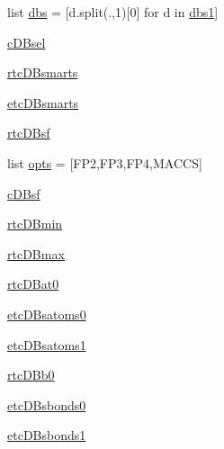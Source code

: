 \begin{DoxyCompactItemize}
list \hyperlink{classmolSimplify_1_1Classes_1_1mGUI_1_1mGUI_a1a51df5812fa8895e74f13104e0fd043}{dbs} = \mbox{[}d.\+split(\textquotesingle{}.\textquotesingle{},1)\mbox{[}0\mbox{]} for d in \hyperlink{classmolSimplify_1_1Classes_1_1mGUI_1_1mGUI_a83690ec49c577263f54a274b8e01853c}{dbs1}\mbox{]}
\item 
\hyperlink{classmolSimplify_1_1Classes_1_1mGUI_1_1mGUI_a847a0f6d747033d64d3c2d88321b89c9}{c\+D\+Bsel}
\item 
\hyperlink{classmolSimplify_1_1Classes_1_1mGUI_1_1mGUI_a5767250f28f1dfa0ac3a1ed1f6d3591c}{rtc\+D\+Bsmarts}
\item 
\hyperlink{classmolSimplify_1_1Classes_1_1mGUI_1_1mGUI_a6b2ec375a45bcb83a434428deb00eec7}{etc\+D\+Bsmarts}
\item 
\hyperlink{classmolSimplify_1_1Classes_1_1mGUI_1_1mGUI_a3fbee35e6b168e8e9646b5b912ca6afb}{rtc\+D\+Bsf}
\item 
list \hyperlink{classmolSimplify_1_1Classes_1_1mGUI_1_1mGUI_a314c6272f4ddb71df73450c10a811e0b}{opts} = \mbox{[}\textquotesingle{}F\+P2\textquotesingle{},\textquotesingle{}F\+P3\textquotesingle{},\textquotesingle{}F\+P4\textquotesingle{},\textquotesingle{}M\+A\+C\+CS\textquotesingle{}\mbox{]}
\item 
\hyperlink{classmolSimplify_1_1Classes_1_1mGUI_1_1mGUI_afa8b4ac769ead7564c57f2aff44f2b80}{c\+D\+Bsf}
\item 
\hyperlink{classmolSimplify_1_1Classes_1_1mGUI_1_1mGUI_a074d155ea6656c51cd51803b267e4b39}{rtc\+D\+Bmin}
\item 
\hyperlink{classmolSimplify_1_1Classes_1_1mGUI_1_1mGUI_a141848bd8ebdfdec0aa4c0fc9a102c06}{rtc\+D\+Bmax}
\item 
\hyperlink{classmolSimplify_1_1Classes_1_1mGUI_1_1mGUI_a932e02b267b736d239662849eae99d60}{rtc\+D\+Bat0}
\item 
\hyperlink{classmolSimplify_1_1Classes_1_1mGUI_1_1mGUI_a2a37ee3c2add82ec22c14fd2515fc4d0}{etc\+D\+Bsatoms0}
\item 
\hyperlink{classmolSimplify_1_1Classes_1_1mGUI_1_1mGUI_a79ecdafac91200ea59f6d19e3dc20f8a}{etc\+D\+Bsatoms1}
\item 
\hyperlink{classmolSimplify_1_1Classes_1_1mGUI_1_1mGUI_a0fee56937fdcb5b95c04f2cae856200e}{rtc\+D\+Bb0}
\item 
\hyperlink{classmolSimplify_1_1Classes_1_1mGUI_1_1mGUI_acc33db39e24e35c0087136029883e7cd}{etc\+D\+Bsbonds0}
\item 
\hyperlink{classmolSimplify_1_1Classes_1_1mGUI_1_1mGUI_a8c34fe5b58493b9d235ab34cf7b72827}{etc\+D\+Bsbonds1}

\end{DoxyCompactItemize}
